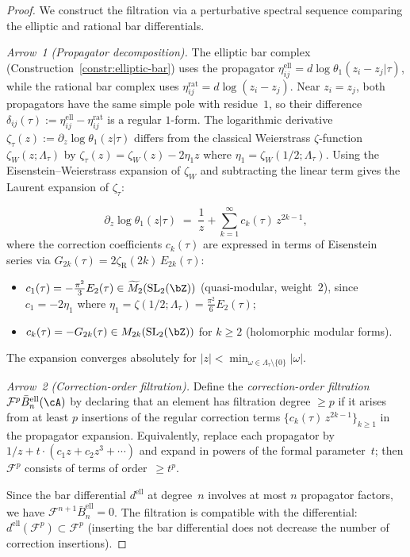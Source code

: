 \begin{proof}
We construct the filtration via a perturbative spectral sequence
comparing the elliptic and rational bar differentials.

\emph{Arrow~1 (Propagator decomposition).}
The elliptic bar complex (Construction~\ref{constr:elliptic-bar})
uses the propagator $\eta_{ij}^{\mathrm{ell}} = d\log\theta_1(z_i -
z_j|\tau)$, while the rational bar complex uses $\eta_{ij}^{\mathrm{rat}}
= d\log(z_i - z_j)$. Near $z_i = z_j$, both propagators have the same
simple pole with residue~$1$, so their difference $\delta_{ij}(\tau) :=
\eta_{ij}^{\mathrm{ell}} - \eta_{ij}^{\mathrm{rat}}$ is a regular
$1$-form. The logarithmic derivative $\zeta_\tau(z) :=
\partial_z\log\theta_1(z|\tau)$ differs from the classical
Weierstrass $\zeta$-function $\zeta_W(z;\Lambda_\tau)$ by
$\zeta_\tau(z) = \zeta_W(z) - 2\eta_1 z$ where
$\eta_1 = \zeta_W(1/2;\Lambda_\tau)$. Using the
Eisenstein--Weierstrass expansion of $\zeta_W$ and subtracting
the linear term gives the Laurent expansion of $\zeta_\tau$:

\[
\partial_z\log\theta_1(z|\tau)
\;=\; \frac{1}{z} + \sum_{k=1}^{\infty} c_k(\tau)\,z^{2k-1},
\]
where the correction coefficients $c_k(\tau)$ are expressed in terms
of Eisenstein series via $G_{2k}(\tau) = 2\zeta_{\mathrm{R}}(2k)\,
E_{2k}(\tau)$:
\begin{itemize}
\item $c_1(\tau) = -\tfrac{\pi^2}{3}E_2(\tau) \in
\widetilde{M}_2(\mathrm{SL}_2(\bZ))$ (quasi-modular, weight~$2$),
since $c_1 = -2\eta_1$ where
$\eta_1 = \zeta(1/2;\Lambda_\tau) = \tfrac{\pi^2}{6}E_2(\tau)$;
\item $c_k(\tau) = -G_{2k}(\tau) \in M_{2k}(\mathrm{SL}_2(\bZ))$
for $k \geq 2$ (holomorphic modular forms).
\end{itemize}
The expansion converges absolutely for $|z| < \min_{\omega \in
\Lambda_\tau \setminus\{0\}} |\omega|$.

\emph{Arrow~2 (Correction-order filtration).}
Define the \emph{correction-order filtration}
$\mathcal{F}^p \bar{B}^{\mathrm{ell}}_n(\cA)$ by
declaring that an element has filtration degree $\geq p$ if it arises
from at least $p$ insertions of the regular correction terms
$\{c_k(\tau)\,z^{2k-1}\}_{k \geq 1}$ in the propagator expansion.
Equivalently, replace each propagator by $1/z + t\cdot(c_1 z + c_2 z^3
+ \cdots)$ and expand in powers of the formal parameter~$t$; then
$\mathcal{F}^p$ consists of terms of order~$\geq t^p$.

Since the bar differential $d^{\mathrm{ell}}$ at degree~$n$
involves at most $n$ propagator factors, we have $\mathcal{F}^{n+1}
\bar{B}^{\mathrm{ell}}_n = 0$. The filtration is compatible
with the differential: $d^{\mathrm{ell}}(\mathcal{F}^p) \subset
\mathcal{F}^p$ (inserting the bar differential does not decrease
the number of correction insertions).


\end{proof}

